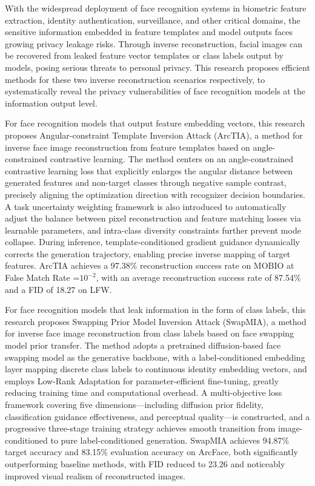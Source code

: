 \begin{eabstract}
With the widespread deployment of face recognition systems in biometric feature extraction, identity authentication, surveillance, and other critical domains, the sensitive information embedded in feature templates and model outputs faces growing privacy leakage risks. Through inverse reconstruction, facial images can be recovered from leaked feature vector templates or class labels output by models, posing serious threats to personal privacy. This research proposes efficient methods for these two inverse reconstruction scenarios respectively, to systematically reveal the privacy vulnerabilities of face recognition models at the information output level.

For face recognition models that output feature embedding vectors, this research proposes Angular-constraint Template Inversion Attack (ArcTIA), a method for inverse face image reconstruction from feature templates based on angle-constrained contrastive learning. The method centers on an angle-constrained contrastive learning loss that explicitly enlarges the angular distance between generated features and non-target classes through negative sample contrast, precisely aligning the optimization direction with recognizer decision boundaries. A task uncertainty weighting framework is also introduced to automatically adjust the balance between pixel reconstruction and feature matching losses via learnable parameters, and intra-class diversity constraints further prevent mode collapse. During inference, template-conditioned gradient guidance dynamically corrects the generation trajectory, enabling precise inverse mapping of target features. ArcTIA achieves a 97.38\% reconstruction success rate on MOBIO at False Match Rate =$10^{-2}$, with an average reconstruction success rate of 87.54\% and a FID of 18.27 on LFW.

For face recognition models that leak information in the form of class labels, this research proposes Swapping Prior Model Inversion Attack (SwapMIA), a method for inverse face image reconstruction from class labels based on face swapping model prior transfer. The method adopts a pretrained diffusion-based face swapping model as the generative backbone, with a label-conditioned embedding layer mapping discrete class labels to continuous identity embedding vectors, and employs Low-Rank Adaptation for parameter-efficient fine-tuning, greatly reducing training time and computational overhead. A multi-objective loss framework covering five dimensions---including diffusion prior fidelity, classification guidance effectiveness, and perceptual quality---is constructed, and a progressive three-stage training strategy achieves smooth transition from image-conditioned to pure label-conditioned generation. SwapMIA achieves 94.87\% target accuracy and 83.15\% evaluation accuracy on ArcFace, both significantly outperforming baseline methods, with FID reduced to 23.26 and noticeably improved visual realism of reconstructed images.


\end{eabstract}

